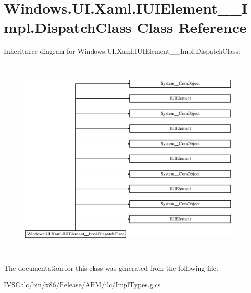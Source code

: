 \hypertarget{class_windows_1_1_u_i_1_1_xaml_1_1_i_u_i_element_____impl_1_1_dispatch_class}{}\section{Windows.\+U\+I.\+Xaml.\+I\+U\+I\+Element\+\_\+\+\_\+\+Impl.\+Dispatch\+Class Class Reference}
\label{class_windows_1_1_u_i_1_1_xaml_1_1_i_u_i_element_____impl_1_1_dispatch_class}
Inheritance diagram for Windows.\+U\+I.\+Xaml.\+I\+U\+I\+Element\+\_\+\+\_\+\+Impl.\+Dispatch\+Class\+:\begin{figure}[H]
\begin{center}
\leavevmode
\includegraphics[height=10.301003cm]{class_windows_1_1_u_i_1_1_xaml_1_1_i_u_i_element_____impl_1_1_dispatch_class}
\end{center}
\end{figure}


The documentation for this class was generated from the following file\+:\begin{DoxyCompactItemize}
\item 
I\+V\+S\+Calc/bin/x86/\+Release/\+A\+R\+M/ilc/Impl\+Types.\+g.\+cs\end{DoxyCompactItemize}
